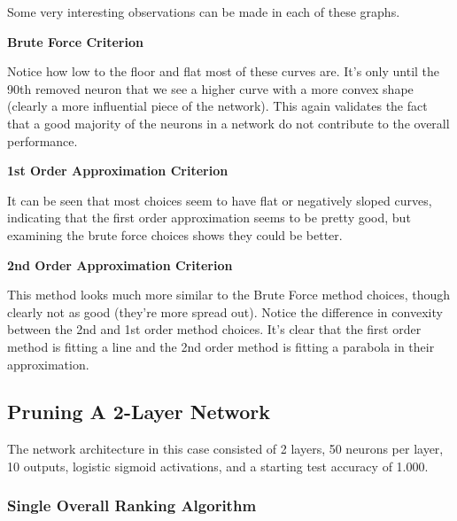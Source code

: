 
Some very interesting observations can be made in each of these graphs.

\textbf{Brute Force Criterion}

Notice how low to the floor and flat most of these curves are. It's only until the 90th removed neuron that we see a higher curve with a more convex shape (clearly a more influential piece of the network). This again validates the fact that a good majority of the neurons in a network do not contribute to the overall performance. 

\textbf{1st Order Approximation Criterion}

It can be seen that most choices seem to have flat or negatively sloped curves, indicating that the first order approximation seems to be pretty good, but examining the brute force choices shows they could be better. 

\textbf{2nd Order Approximation Criterion}

This method looks much more similar to the Brute Force method choices, though clearly not as good (they're more spread out). Notice the difference in convexity between the 2nd and 1st order method choices. It's clear that the first order method is fitting a line and the 2nd order method is fitting a parabola in their approximation. 

\subsection{Pruning A 2-Layer Network}
The network architecture in this case consisted of 2 layers, 50 neurons per layer, 10 outputs, logistic sigmoid activations, and a starting test accuracy of 1.000.
\subsubsection{Single Overall Ranking Algorithm}

